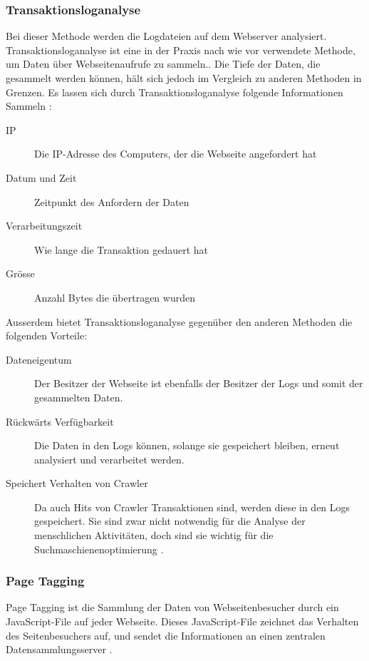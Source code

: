 \subsubsection{Transaktionsloganalyse} 
Bei dieser Methode werden die Logdateien auf dem Webserver analysiert. Transaktionsloganalyse ist eine in der Praxis nach wie vor verwendete Methode, um Daten über Webseitenaufrufe zu sammeln.\parencite[S. 173]{nakatani2011toolselectionmethod}. Die Tiefe der Daten, die gesammelt werden können, hält sich jedoch im Vergleich zu anderen Methoden in Grenzen. Es lassen sich durch Transaktionsloganalyse folgende Informationen Sammeln \parencite[S. 2]{waisberg2009webShort}:

\begin{description}
  \item[IP] Die IP-Adresse des Computers, der die Webseite angefordert hat
  \item[Datum und Zeit] Zeitpunkt des Anfordern der Daten
  \item[Verarbeitungszeit] Wie lange die Transaktion gedauert hat
  \item[Grösse] Anzahl Bytes die übertragen wurden
\end{description}

Ausserdem bietet Transaktionsloganalyse gegenüber den anderen Methoden die folgenden Vorteile\parencite[S. 2]{waisberg2009webShort}:

\begin{description}
  \item[Dateneigentum] Der Besitzer der Webseite ist ebenfalls der Besitzer der Logs und somit der gesammelten Daten. 
  \item[Rückwärts Verfügbarkeit] Die Daten in den Logs können, solange sie gespeichert bleiben, erneut analysiert und verarbeitet werden. 
  \item[Speichert Verhalten von Crawler] Da auch Hits von Crawler Transaktionen sind, werden diese in den Logs gespeichert. Sie sind zwar nicht notwendig für die Analyse der menschlichen Aktivitäten, doch sind sie wichtig für die Suchmaschienenoptimierung \parencite[S. 174]{nakatani2011toolselectionmethod}. 
\end{description}


\subsubsection{Page Tagging} 
Page Tagging ist die Sammlung der Daten von Webseitenbesucher durch ein JavaScript-File auf jeder Webseite. Dieses JavaScript-File zeichnet das Verhalten des Seitenbesuchers auf, und sendet die Informationen an einen zentralen Datensammlungsserver \parencite[S. 173]{nakatani2011toolselectionmethod}.

